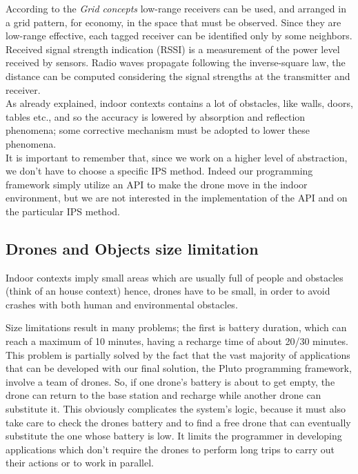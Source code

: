 According to the \textit{Grid concepts} low-range receivers can be used, and arranged in a grid pattern, for economy, in the space that must be observed.
Since they are low-range effective, each tagged receiver can be identified only by some neighbors.
\\

Received signal strength indication (RSSI) is a measurement of the power level received by sensors.
Radio waves propagate following the inverse-square law, the distance can be computed considering the signal strengths at the transmitter and receiver.
\\

As already explained, indoor contexts contains a lot of obstacles, like walls, doors, tables etc., and so the accuracy is lowered by absorption and reflection phenomena; some corrective mechanism must be adopted to lower these phenomena.
\\

It is important to remember that, since we work on a higher level of abstraction, we don't have to choose a specific IPS method.
Indeed our programming framework simply utilize an API to make the drone move in the indoor environment, but we are not interested in the implementation of the API and on the particular IPS method.

\newpage

\subsection{Drones and Objects size limitation}


Indoor contexts imply small areas which are usually full of people and obstacles (think of an house context) hence, drones have to be small, in order to avoid crashes with both human and environmental obstacles.

Size limitations result in many problems; the first is battery duration, which can reach a maximum of 10 minutes, having a recharge time of about 20/30 minutes.
This problem is partially solved by the fact that the vast majority of applications that can be developed with our final solution, the Pluto programming framework, involve a team of drones. 
So, if one drone's battery is about to get empty, the drone can return to the base station and recharge while another drone can substitute it.
This obviously complicates the system's logic, because it must also take care to check the drones battery and to find a free drone that can eventually substitute the one whose battery is low.
It limits the programmer in developing applications which don't require the drones to perform long trips to carry out their actions or to work in parallel.

